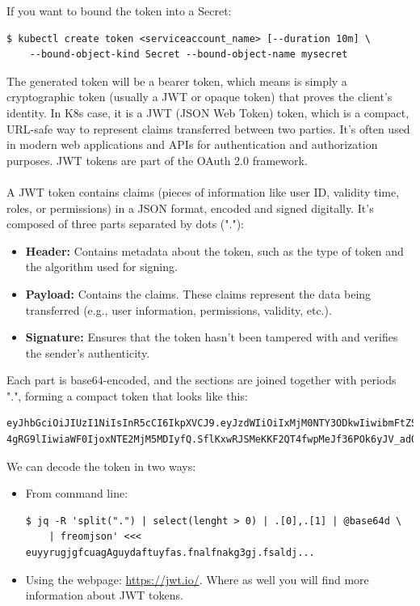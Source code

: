 \documentclass{article}
\newenvironment{codetemplate}[1][]{%
  \mybasecolorbox[#1]
  \itshape
}{%
  \endmybasecolorbox
}
\begin{document}
If you want to bound the token into a Secret:
\begin{codetemplate}{}
\begin{verbatim}
$ kubectl create token <serviceaccount_name> [--duration 10m] \
    --bound-object-kind Secret --bound-object-name mysecret
\end{verbatim}
\end{codetemplate}

The generated token will be a bearer token, which means is simply a cryptographic token (usually a JWT or opaque token) that proves the client's identity.
In K8s case, it is a JWT (JSON Web Token) token, which is a compact, URL-safe way to represent claims transferred between two parties. It's often used in modern web applications and APIs for authentication and authorization purposes. JWT tokens are part of the OAuth 2.0 framework.
\\\\
A JWT token contains claims (pieces of information like user ID, validity time, roles, or permissions) in a JSON format, encoded and signed digitally. It's composed of three parts separated by dots ("."):
\begin{itemize}
    \item \textbf{Header:} Contains metadata about the token, such as the type of token and the algorithm used for signing.
    \item \textbf{Payload:} Contains the claims. These claims represent the data being transferred (e.g., user information, permissions, validity, etc.).
    \item \textbf{Signature:} Ensures that the token hasn't been tampered with and verifies the sender's authenticity.
\end{itemize}
Each part is base64-encoded, and the sections are joined together with periods ".", forming a compact token that looks like this:
\begin{codetemplate}{}
\begin{verbatim}
eyJhbGciOiJIUzI1NiIsInR5cCI6IkpXVCJ9.eyJzdWIiOiIxMjM0NTY3ODkwIiwibmFtZSI6IkpvaG
4gRG9lIiwiaWF0IjoxNTE2MjM5MDIyfQ.SflKxwRJSMeKKF2QT4fwpMeJf36POk6yJV_adQssw5c
\end{verbatim}
\end{codetemplate}

We can decode the token in two ways:
\begin{itemize}
    \item From command line:
\begin{codetemplate}{}
\begin{verbatim}
$ jq -R 'split(".") | select(lenght > 0) | .[0],.[1] | @base64d \
    | freomjson' <<< euyyrugjgfcuagAguydaftuyfas.fnalfnakg3gj.fsaldj...
\end{verbatim}
\end{codetemplate}
    \item Using the webpage: \href{https://jwt.io/}{https://jwt.io/}. Where as well you will find more information about JWT tokens.
\end{itemize}
\end{document}
